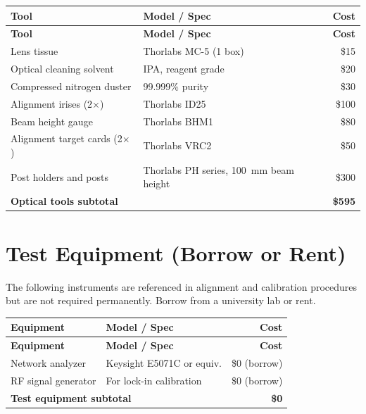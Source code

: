 \documentclass[11pt,a4paper,openany]{book}
\begin{document}
\begin{center}
\begin{longtable}{p{5cm}lr}
\toprule
\textbf{Tool} & \textbf{Model / Spec} & \textbf{Cost} \\
\midrule
\endfirsthead
\toprule
\textbf{Tool} & \textbf{Model / Spec} & \textbf{Cost} \\
\midrule
\endhead
\bottomrule
\endfoot
\bottomrule
\endlastfoot
Lens tissue & Thorlabs MC-5 (1 box) & \$15 \\
Optical cleaning solvent & IPA, reagent grade & \$20 \\
Compressed nitrogen duster & 99.999\% purity & \$30 \\
Alignment irises (2$\times$) & Thorlabs ID25 & \$100 \\
Beam height gauge & Thorlabs BHM1 & \$80 \\
Alignment target cards (2$\times$) & Thorlabs VRC2 & \$50 \\
Post holders and posts & Thorlabs PH series, 100~mm beam height & \$300 \\
\midrule
\multicolumn{2}{l}{\textbf{Optical tools subtotal}} & \textbf{\$595} \\
\end{longtable}
\end{center}

\section{Test Equipment (Borrow or Rent)}

The following instruments are referenced in alignment and calibration procedures but are not required permanently. Borrow from a university lab or rent.

\begin{center}
\begin{longtable}{p{5cm}lr}
\toprule
\textbf{Equipment} & \textbf{Model / Spec} & \textbf{Cost} \\
\midrule
\endfirsthead
\toprule
\textbf{Equipment} & \textbf{Model / Spec} & \textbf{Cost} \\
\midrule
\endhead
\bottomrule
\endfoot
\bottomrule
\endlastfoot
Network analyzer & Keysight E5071C or equiv. & \$0 (borrow) \\
RF signal generator & For lock-in calibration & \$0 (borrow) \\
\midrule
\multicolumn{2}{l}{\textbf{Test equipment subtotal}} & \textbf{\$0} \\
\end{longtable}
\end{center}
\end{document}
